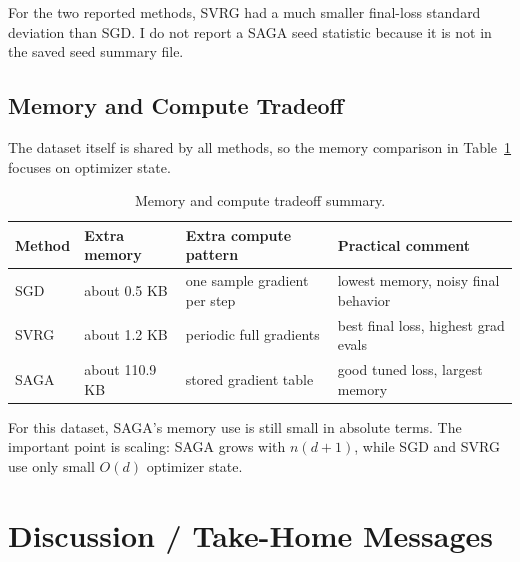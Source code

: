 \documentclass{article}
\begin{document}
For the two reported methods, SVRG had a much smaller final-loss standard
deviation than SGD. I do not report a SAGA seed statistic because it is not in
the saved seed summary file.

\subsection{Memory and Compute Tradeoff}

The dataset itself is shared by all methods, so the memory comparison in
Table~\ref{tab:tradeoff} focuses on optimizer state.

\begin{table}[H]
\centering
\caption{Memory and compute tradeoff summary.}
\label{tab:tradeoff}
\small
\begin{tabular}{lp{}p{}p{}}
\toprule
Method & Extra memory & Extra compute pattern & Practical comment \\
\midrule
SGD  & about 0.5 KB & one sample gradient per step & lowest memory, noisy final behavior \\
SVRG & about 1.2 KB & periodic full gradients & best final loss, highest grad evals \\
SAGA & about 110.9 KB & stored gradient table & good tuned loss, largest memory \\
\bottomrule
\end{tabular}
\end{table}

For this dataset, SAGA's memory use is still small in absolute terms. The
important point is scaling: SAGA grows with $n(d+1)$, while SGD and SVRG use
only small $O(d)$ optimizer state.

\section{Discussion / Take-Home Messages}
\end{document}
